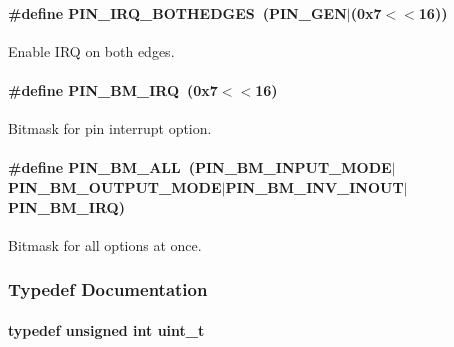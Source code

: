 \paragraph[{P\-I\-N\-\_\-\-I\-R\-Q\-\_\-\-B\-O\-T\-H\-E\-D\-G\-E\-S}]{\setlength{\rightskip}{0pt plus 5cm}\#define P\-I\-N\-\_\-\-I\-R\-Q\-\_\-\-B\-O\-T\-H\-E\-D\-G\-E\-S~({\bf P\-I\-N\-\_\-\-G\-E\-N}$|$(0x7$<$$<$16))}\label{_p_i_n_8h_aba2bee3661f16506e67c7fd8289ccf8f}


Enable I\-R\-Q on both edges. 

\paragraph[{P\-I\-N\-\_\-\-B\-M\-\_\-\-I\-R\-Q}]{\setlength{\rightskip}{0pt plus 5cm}\#define P\-I\-N\-\_\-\-B\-M\-\_\-\-I\-R\-Q~(0x7$<$$<$16)}\label{_p_i_n_8h_a68cbd2a310fc62c0810754d0894cfeee}


Bitmask for pin interrupt option. 

\paragraph[{P\-I\-N\-\_\-\-B\-M\-\_\-\-A\-L\-L}]{\setlength{\rightskip}{0pt plus 5cm}\#define P\-I\-N\-\_\-\-B\-M\-\_\-\-A\-L\-L~({\bf P\-I\-N\-\_\-\-B\-M\-\_\-\-I\-N\-P\-U\-T\-\_\-\-M\-O\-D\-E}$|${\bf P\-I\-N\-\_\-\-B\-M\-\_\-\-O\-U\-T\-P\-U\-T\-\_\-\-M\-O\-D\-E}$|${\bf P\-I\-N\-\_\-\-B\-M\-\_\-\-I\-N\-V\-\_\-\-I\-N\-O\-U\-T}$|${\bf P\-I\-N\-\_\-\-B\-M\-\_\-\-I\-R\-Q})}\label{_p_i_n_8h_a7567bcbdf26a95ea42a860aa9beb5a11}


Bitmask for all options at once. 



\subsubsection{Typedef Documentation}
\paragraph[{uint\-\_\-t}]{\setlength{\rightskip}{0pt plus 5cm}typedef unsigned int {\bf uint\-\_\-t}}\label{_p_i_n_8h_a12a1e9b3ce141648783a82445d02b58d}
